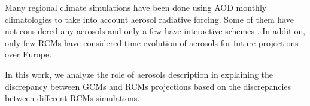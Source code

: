


   Many regional climate simulations have been done using AOD monthly climatologies to take into account aerosol radiative forcing. Some of them have not considered any aerosols and only a few have interactive schemes \cite*{Nabat2013}. In addition, only few RCMs have considered time evolution of aerosols for future projections over Europe.

   In this work, we analyze the role of aerosols description in explaining the discrepancy between GCMs and RCMs projections based on the discrepancies between different RCMs simulations.
   

   

